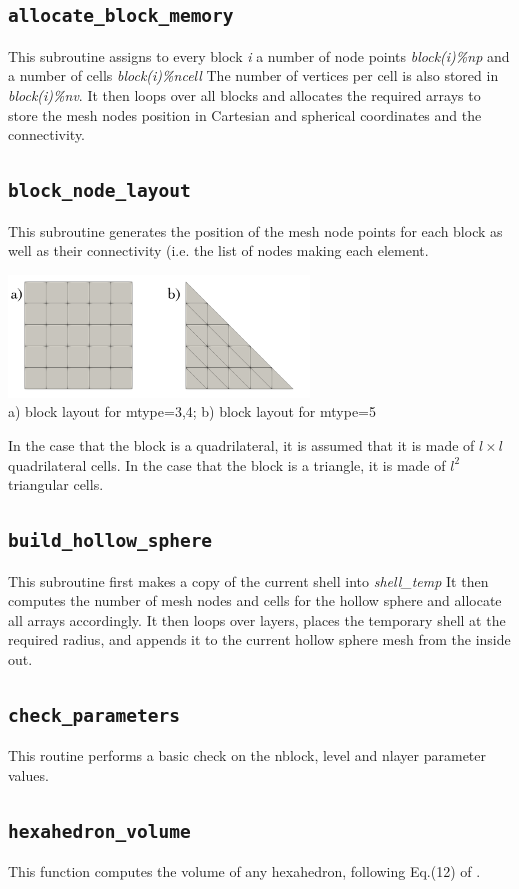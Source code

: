  \subsection{\tt allocate\_block\_memory}
 This subroutine assigns to every block {\sl i} a number of node 
 points {\sl block(i)\%np} and a number of cells {\sl block(i)\%ncell}  
 The number of vertices per cell is also stored in {\sl block(i)\%nv}.
 It then loops over all blocks and allocates the required arrays 
 to store the mesh nodes position in Cartesian and spherical coordinates
 and the connectivity.  
 \subsection{\tt block\_node\_layout}
 This subroutine generates the position of the mesh node points for each 
 block as well as their connectivity (i.e. the list of nodes making 
 each element. 
 \begin{center}
 \includegraphics[width=8cm]{images/basics}\\
 {\small a) block layout for mtype=3,4; b) block layout for mtype=5}
 \end{center}
 In the case that the block is a quadrilateral, it is assumed that 
 it is made of $l \times l$ quadrilateral cells. In the case that the block is a 
 triangle, it is made of $l^2$ triangular cells.
 \subsection{\tt build\_hollow\_sphere}
 This subroutine first makes a copy of the current shell into {\sl shell\_temp}
 It then computes the number of mesh nodes and cells for the hollow sphere
 and allocate all arrays accordingly.
 It then loops over layers, places the temporary shell at the required 
 radius, and appends it to the current hollow sphere mesh from the inside out.
 \subsection{\tt check\_parameters}
 This routine performs a basic check on the nblock, level and nlayer parameter values.
 \subsection{\tt hexahedron\_volume}
 This function computes the volume of any hexahedron, 
 following Eq.(12) of \cite{gran97}.
